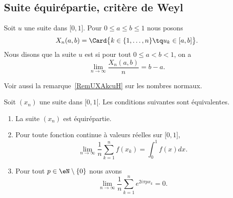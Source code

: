 \subsection{Suite équirépartie, critère de Weyl}

\begin{definition}
	Soit \( u\) une suite dans \( \mathopen[ 0 , 1 \mathclose]\). Pour \( 0\leq a\leq b\leq 1\) nous posons
	\begin{equation}
		X_n(a,b)=\Card\big\{  k\in\{ 1,\ldots, n \}\tq u_k\in\mathopen[ a , b \mathclose] \big\}.
	\end{equation}
	Nous disons que la suite \( u\) est  si pour tout \( 0\leq a<b<1\), on a
	\begin{equation}
		\lim_{n\to \infty} \frac{ X_n(a,b) }{ n }=b-a.
	\end{equation}
\end{definition}
Voir aussi la remarque~\ref{RemUXAkcuH} sur les nombres normaux.

\begin{proposition}  \label{PropDMvPDc}
	Soit \( (x_n)\) une suite dans \( \mathopen[ 0 , 1 [\). Les conditions suivantes sont équivalentes.
	\begin{enumerate}
		\item   \label{ItemKWcZTHqi}
		      La suite \( (x_n)\) est équirépartie.
		\item\label{ItemKWcZTHqii}
		      Pour toute fonction continue à valeurs réelles sur \( \mathopen[ 0 , 1 \mathclose]\),
		      \begin{equation}    \label{EqBSqdjpn}
			      \lim_{n\to \infty} \frac{1}{ n }\sum_{k=1}^nf(x_k)=\int_0^1f(x)dx.
		      \end{equation}
		\item\label{ItemKWcZTHqiii}
		      Pour tout \( p\in\eN\setminus\{ 0 \}\) nous avons
		      \begin{equation}
			      \lim_{n\to \infty} \frac{1}{ n }\sum_{k=1}^n e^{2i\pi px_k}=0.
		      \end{equation}
	\end{enumerate}
\end{proposition}

